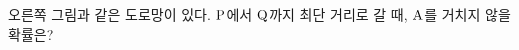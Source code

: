 \noindent\begin{minipage}[t]{0.58\linewidth}\vspace{0pt}\raggedright 오른쪽 그림과 같은 도로망이 있다. $\mathrm{P}$에서 $\mathrm{Q}$까지 최단 거리로 갈 때, $\mathrm{A}$를 거치지 않을 확률은? \end{minipage}\hfill\begin{minipage}[t]{0.4\linewidth}\vspace{0pt}\centering \resizebox{\ifdim\width>\linewidth\linewidth\else\width\fi}{!}{}\end{minipage}\par
{}
